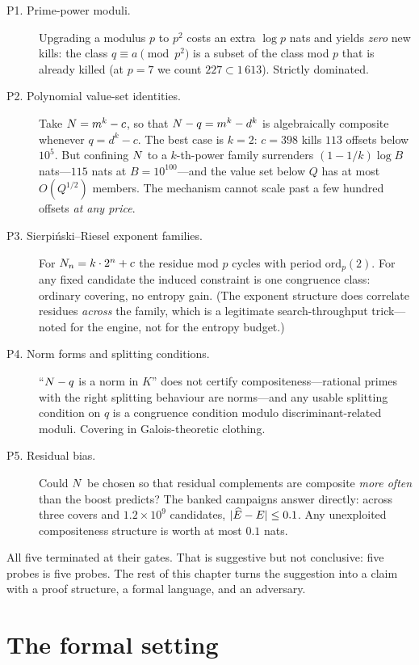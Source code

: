 \begin{description}
\item[P1. Prime-power moduli.] Upgrading a modulus $p$ to $p^{2}$ costs an extra
$\log p$ nats and yields \emph{zero} new kills: the class $q\equiv a\pmod{p^{2}}$
is a subset of the class mod $p$ that is already killed (at $p=7$ we count
$227\subset1\,613$). Strictly dominated.

\item[P2. Polynomial value-set identities.] Take $N=m^{k}-c$, so that
$N-q=m^{k}-d^{k}$ is algebraically composite whenever $q=d^{k}-c$. The best
case is $k=2$: $c=398$ kills $113$ offsets below $10^{5}$. But confining $N$ to
a $k$-th-power family surrenders $(1-1/k)\log B$ nats---$115$ nats at
$B=10^{100}$---and the value set below $Q$ has at most $O(Q^{1/2})$ members. The
mechanism cannot scale past a few hundred offsets \emph{at any price}.

\item[P3. Sierpi\'nski--Riesel exponent families.] For $N_n=k\cdot2^{n}+c$ the
residue mod $p$ cycles with period $\mathrm{ord}_p(2)$. For any fixed candidate
the induced constraint is one congruence class: ordinary covering, no entropy
gain. (The exponent structure does correlate residues \emph{across} the family,
which is a legitimate search-throughput trick---noted for the engine, not for
the entropy budget.)

\item[P4. Norm forms and splitting conditions.] ``$N-q$ is a norm in $K$'' does
not certify compositeness---rational primes with the right splitting behaviour
are norms---and any usable splitting condition on $q$ is a congruence condition
modulo discriminant-related moduli. Covering in Galois-theoretic clothing.

\item[P5. Residual bias.] Could $N$ be chosen so that residual complements are
composite \emph{more often} than the boost predicts? The banked campaigns answer
directly: across three covers and $1.2\times10^{9}$ candidates,
$|\widehat{E}-E|\le0.1$. Any unexploited compositeness structure is worth at most
$0.1$ nats.
\end{description}

All five terminated at their gates. That is suggestive but not conclusive: five
probes is five probes. The rest of this chapter turns the suggestion into a
claim with a proof structure, a formal language, and an adversary.

\section{The formal setting}

